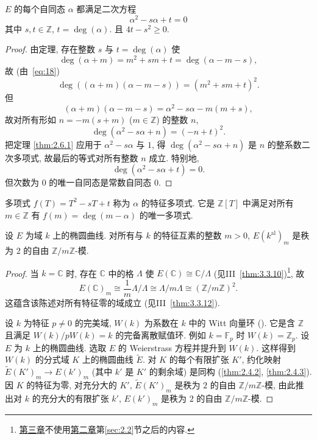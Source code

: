 \begin{corollary} \label{thm:2.6.2} 
$E$ 的每个自同态 $\alpha$ 都满足二次方程
\[
\alpha^2 - s\alpha + t = 0
\]
其中 $s, t\in\mathbb{Z}$, $t = \deg(\alpha)$. 且 $4t - s^2\ge 0$.
\end{corollary}

\begin{proof}
由定理, 存在整数 $s$ 与 $t = \deg(\alpha)$ 使
\[
\deg(\alpha + m) = m^2 + sm + t = \deg(\alpha - m - s),
\]
故 (由~\eqref{eq:18})
\[
\deg((\alpha+m)(\alpha - m - s)) = (m^2 + sm + t)^2.
\]
但
\[
(\alpha+m)(\alpha - m - s) = \alpha^2 - s\alpha - m(m+s),
\]
故对所有形如 $n = -m(s+m)$ ($m\in\mathbb{Z}$) 的整数 $n$,
\[
\deg(\alpha^2 - s\alpha + n) = (-n + t)^2.
\]
把定理 \ref{thm:2.6.1} 应用于 $\alpha^2 - s\alpha$ 与 $1$, 得 $\deg(\alpha^2 - s\alpha + n)$ 是 $n$ 的整系数二次多项式, 故最后的等式对所有整数 $n$ 成立. 特别地,
\[
\deg(\alpha^2 - s\alpha + t) = 0.
\]
但次数为 $0$ 的唯一自同态是常数自同态 $0$.
\end{proof}

多项式 $f(T) = T^2 - sT + t$ 称为 $\alpha$ 的特征多项式. 它是 $\mathbb{Z}[T]$ 中满足对所有 $m\in\mathbb{Z}$ 有 $f(m) = \deg(m - \alpha)$ 的唯一多项式.

\begin{proposition} \label{thm:2.6.3} 
设 $E$ 为域 $k$ 上的椭圆曲线. 对所有与 $k$ 的特征互素的整数 $m > 0$, $E(k^{\mathrm{al}})_m$ 是秩为 $2$ 的自由 $\mathbb{Z}/m\mathbb{Z}$-模.
\end{proposition}

\begin{proof}
当 $k = \mathbb{C}$ 时, 存在 $\mathbb{C}$ 中的格 $\Lambda$ 使 $E(\mathbb{C})\cong\mathbb{C}/\Lambda$ (见III~\ref{thm:3.3.10})\footnote{\hyperref[ch:3]{第三章}不使用\hyperref[ch:2]{第二章}第\ref{sec:2.2}节之后的内容.}, 故
\[
E(\mathbb{C})_m\cong\frac{1}{m}\Lambda/\Lambda\cong\Lambda/m\Lambda\cong(\mathbb{Z}/m\mathbb{Z})^2.
\]
这蕴含该陈述对所有特征零的域成立 (见III~\ref{thm:3.3.12}).

设 $k$ 为特征 $p\neq 0$ 的完美域, $W(k)$ 为系数在 $k$ 中的 Witt 向量环 (\cite[Chapter II]{serre1979}). 它是含 $\mathbb{Z}$ 且满足 $W(k)/pW(k) = k$ 的完备离散赋值环. 例如 $k = \mathbb{F}_p$ 时 $W(k) = \mathbb{Z}_p$. 设 $E$ 为 $k$ 上的椭圆曲线. 选取 $E$ 的 Weierstrass 方程并提升到 $W(k)$. 这样得到 $W(k)$ 的分式域 $K$ 上的椭圆曲线 $\tilde{E}$. 对 $K$ 的每个有限扩张 $K'$, 约化映射 $\tilde{E}(K')_m\to E(k')_m$ (其中 $k'$ 是 $K'$ 的剩余域) 是同构 (\ref{thm:2.4.2}, \ref{thm:2.4.3}). 因 $K$ 的特征为零, 对充分大的 $K'$, $\tilde{E}(K')_m$ 是秩为 $2$ 的自由 $\mathbb{Z}/m\mathbb{Z}$-模, 由此推出对 $k$ 的充分大的有限扩张 $k'$, $E(k')_m$ 是秩为 $2$ 的自由 $\mathbb{Z}/m\mathbb{Z}$-模.
\end{proof}

